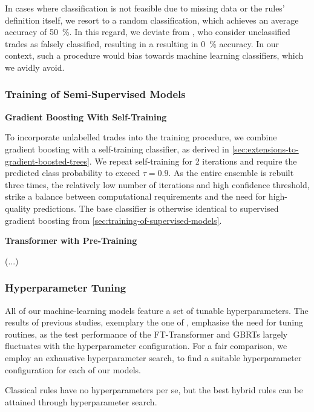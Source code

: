 In cases where classification is not feasible due to missing data or the rules' definition itself, we resort to a random classification, which achieves an average accuracy of \SI{50}{\percent}. In this regard, we deviate from \textcite[][29--32]{grauerOptionTradeClassification2022}, who consider unclassified trades as falsely classified, resulting in a resulting in \SI{0}{\percent} accuracy. In our context, such a procedure would bias towards machine learning classifiers, which we avidly avoid.

\subsubsection{Training of Semi-Supervised
    Models}\label{sec:training-of-semi-supervised-models}

\textbf{Gradient Boosting With Self-Training}

To incorporate unlabelled trades into the training procedure, we combine gradient boosting with a self-training classifier, as derived in \cref{sec:extensions-to-gradient-boosted-trees}. We repeat self-training for 2 iterations and require the predicted class probability to exceed $\tau=0.9$. As the entire ensemble is rebuilt three times, the relatively low number of iterations and high confidence threshold, strike a balance between computational requirements and the need for high-quality predictions. The base classifier is otherwise identical to supervised gradient boosting from \cref{sec:training-of-supervised-models}.

\textbf{Transformer with Pre-Training}

(...)

\subsubsection{Hyperparameter Tuning}\label{sec:hyperparameter-tuning}

All of our machine-learning models feature a set of tunable hyperparameters. The results of previous studies, exemplary the one of \textcite[][5]{grinsztajnWhyTreebasedModels2022}, emphasise the need for tuning routines, as the test performance of the FT-Transformer and \glspl{GBRT} largely fluctuates with the hyperparameter configuration. For a fair comparison, we employ an exhaustive hyperparameter search, to find a suitable hyperparameter configuration for each of our models.

Classical rules have no hyperparameters per se, but the best hybrid rules can be attained through hyperparameter search.

